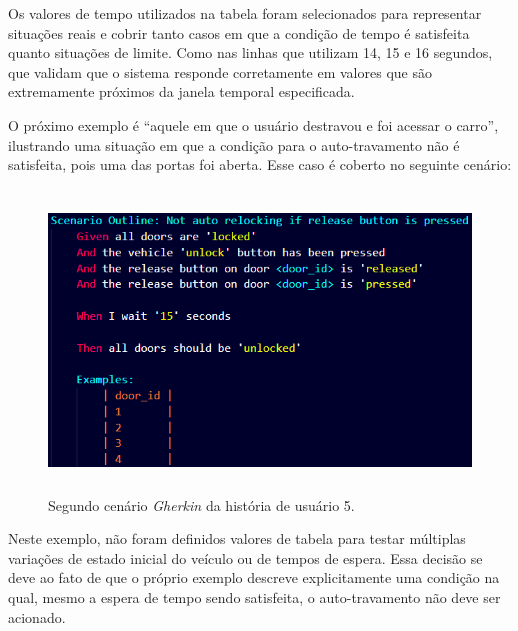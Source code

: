 Os valores de tempo utilizados na tabela foram selecionados para representar situações reais e cobrir tanto casos em que a condição de tempo é satisfeita 
quanto situações de limite. Como nas linhas que utilizam 14, 15 e 16 segundos, que validam que o sistema responde corretamente em valores que são extremamente 
próximos da janela temporal especificada.

O próximo exemplo é ``aquele em que o usuário destravou e foi acessar o carro'', ilustrando uma situação em que a condição para o auto-travamento não é satisfeita, 
pois uma das portas foi aberta. Esse caso é coberto no seguinte cenário:





\begin{figure}[H]
\centering
\includegraphics[height=8cm]{figuras/cenarios/h5c2.png}
\caption{Segundo cenário \textit{Gherkin} da história de usuário 5.}
\label{fig:h5c2}
\end{figure}

Neste exemplo, não foram definidos valores de tabela para testar múltiplas variações de estado inicial do veículo ou de tempos de espera. Essa decisão se deve ao 
fato de que o próprio exemplo descreve explicitamente uma condição na qual, mesmo a espera de tempo sendo satisfeita, o auto-travamento não deve ser acionado.

